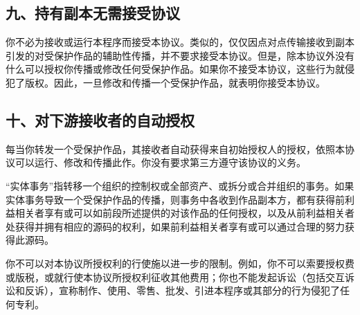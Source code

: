 \subsection{九、持有副本无需接受协议}
你不必为接收或运行本程序而接受本协议。类似的，仅仅因点对点传输接收到副本引发的对受保护作品的辅助性传播，并不要求接受本协议。但是，除本协议外没有什么可以授权你传播或修改任何受保护作品。如果你不接受本协议，这些行为就侵犯了版权。因此，一旦修改和传播一个受保护作品，就表明你接受本协议。
\subsection{十、对下游接收者的自动授权}
每当你转发一个受保护作品，其接收者自动获得来自初始授权人的授权，依照本协议可以运行、修改和传播此作。你没有要求第三方遵守该协议的义务。\par
“实体事务”指转移一个组织的控制权或全部资产、或拆分或合并组织的事务。如果实体事务导致一个受保护作品的传播，则事务中各收到作品副本方，都有获得前利益相关者享有或可以如前段所述提供的对该作品的任何授权，以及从前利益相关者处获得并拥有相应的源码的权利，如果前利益相关者享有或可以通过合理的努力获得此源码。\par
你不可以对本协议所授权利的行使施以进一步的限制。例如，你不可以索要授权费或版税，或就行使本协议所授权利征收其他费用；你也不能发起诉讼（包括交互诉讼和反诉），宣称制作、使用、零售、批发、引进本程序或其部分的行为侵犯了任何专利。
